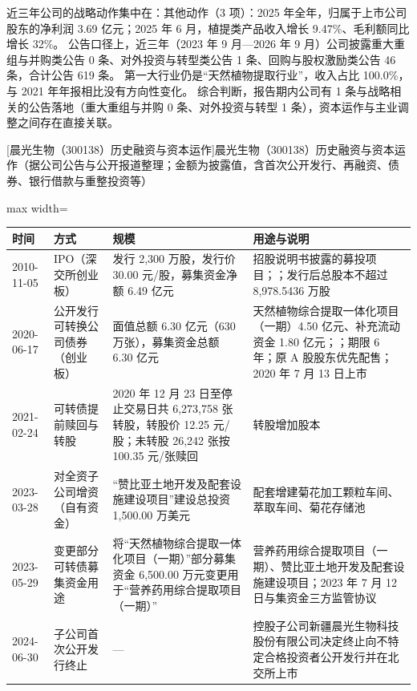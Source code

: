  近三年公司的战略动作集中在：其他动作（3 项）：2025 年全年，归属于上市公司股东的净利润 3.69 亿元；2025 年 6 月，植提类产品收入增长 9.47\%、毛利额同比增长 32\%。 公告口径上，近三年（2023 年 9 月---2026 年 9 月）公司披露重大重组与并购类公告 0 条、对外投资与转型类公告 1 条、回购与股权激励类公告 46 条，合计公告 619 条。 第一大行业仍是“天然植物提取行业”，收入占比 100.0\%，与 2021 年年报相比没有方向性变化。 综合判断，报告期内公司有 1 条与战略相关的公告落地（重大重组与并购 0 条、对外投资与转型 1 条），资本运作与主业调整之间存在直接关联。

\begin{center}\small\setlength{\tabcolsep}{4pt}
[晨光生物（300138）历史融资与资本运作]{晨光生物（300138）历史融资与资本运作（据公司公告与公开报道整理；金额为披露值，含首次公开发行、再融资、债券、银行借款与重整投资等）}
\begin{adjustbox}{max width=\textwidth}
\begin{tabular}{@{}p{1.45cm}p{2.55cm}p{4.05cm}p{4.95cm}@{}}
\toprule
时间 & 方式 & 规模 & 用途与说明 \\
\midrule
2010-11-05 & IPO（深交所创业板） & 发行 2,\allowbreak{}300 万股，\allowbreak{}发行价 30.00 元/\allowbreak{}股，\allowbreak{}募集资金净额 6.49 亿元 & 招股说明书披露的募投项目；；发行后总股本不超过 8,\allowbreak{}978.5436 万股 \\
2020-06-17 & 公开发行可转换公司债券（创业板） & 面值总额 6.30 亿元（630 万张），\allowbreak{}募集资金总额 6.30 亿元 & 天然植物综合提取一体化项目（一期）4.50 亿元、\allowbreak{}补充流动资金 1.80 亿元；；期限 6 年；原 A 股股东优先配售；2020 年 7 月 13 日上市 \\
2021-02-24 & 可转债提前赎回与转股 & 2020 年 12 月 23 日至停止交易日共 6,\allowbreak{}273,\allowbreak{}758 张转股，\allowbreak{}转股价 12.25 元/\allowbreak{}股；未转股 26,\allowbreak{}242 张按 100.35 元/\allowbreak{}张赎回 & 转股增加股本 \\
2023-03-28 & 对全资子公司增资（自有资金） & “赞比亚土地开发及配套设施建设项目”建设总投资 1,\allowbreak{}500.00 万美元 & 配套增建菊花加工颗粒车间、\allowbreak{}萃取车间、\allowbreak{}菊花存储池 \\
2023-05-29 & 变更部分可转债募集资金用途 & 将“天然植物综合提取一体化项目（一期）”部分募集资金 6,\allowbreak{}500.00 万元变更用于“营养药用综合提取项目（一期）” & 营养药用综合提取项目（一期）、\allowbreak{}赞比亚土地开发及配套设施建设项目；2023 年 7 月 12 日与集资金三方监管协议 \\
2024-06-30 & 子公司首次公开发行终止 & --- & 控股子公司新疆晨光生物科技股份有限公司决定终止向不特定合格投资者公开发行并在北交所上市 \\
\bottomrule
\end{tabular}
\end{adjustbox}
\end{center}

